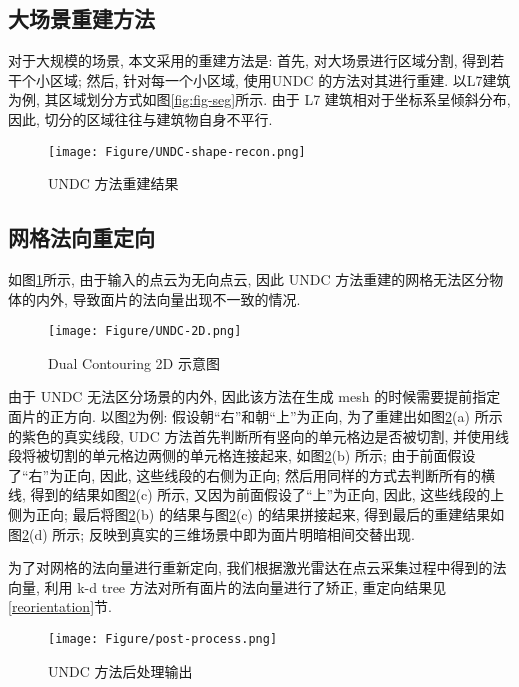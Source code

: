 \subsection{大场景重建方法}

对于大规模的场景, 本文采用的重建方法是: 
首先, 对大场景进行区域分割, 得到若干个小区域; 
然后, 针对每一个小区域, 使用UNDC 的方法对其进行重建. 
以L7建筑为例, 其区域划分方式如图\ref{fig:fig-seg}所示. 由于 L7 建筑相对于坐标系呈倾斜分布, 因此, 切分的区域往往与建筑物自身不平行. 
\vspace{0.5em} %
\begin{figure}[H]
	\center
	\texttt{[image: Figure/UNDC-shape-recon.png]}
	\centering
	\caption{UNDC 方法重建结果}\label{fig:fig-shape-recon}
\end{figure}

\subsection{网格法向重定向}

如图\ref{fig:fig-shape-recon}所示, 由于输入的点云为无向点云, 因此 UNDC 方法重建的网格无法区分物体的内外, 导致面片的法向量出现不一致的情况. 

\begin{figure}[H]
	\center
	\texttt{[image: Figure/UNDC-2D.png]}
	\centering
	\caption{Dual Contouring 2D 示意图}\label{fig:fig-2D-UNDC}
\end{figure}

由于 UNDC 无法区分场景的内外, 因此该方法在生成 mesh 的时候需要提前指定面片的正方向. 
以图\ref{fig:fig-2D-UNDC}为例: 假设朝“右”和朝“上”为正向, 为了重建出如图\ref{fig:fig-2D-UNDC}(a) 所示的紫色的真实线段, UDC 方法首先判断所有竖向的单元格边是否被切割, 并使用线段将被切割的单元格边两侧的单元格连接起来, 如图\ref{fig:fig-2D-UNDC}(b) 所示; 
由于前面假设了“右”为正向, 因此, 这些线段的右侧为正向; 
然后用同样的方式去判断所有的横线, 得到的结果如图\ref{fig:fig-2D-UNDC}(c) 所示, 又因为前面假设了“上”为正向, 因此, 这些线段的上侧为正向; 
最后将图\ref{fig:fig-2D-UNDC}(b) 的结果与图\ref{fig:fig-2D-UNDC}(c) 的结果拼接起来, 得到最后的重建结果如图\ref{fig:fig-2D-UNDC}(d) 所示; 
反映到真实的三维场景中即为面片明暗相间交替出现. 

为了对网格的法向量进行重新定向, 我们根据激光雷达在点云采集过程中得到的法向量, 利用 k-d tree 方法对所有面片的法向量进行了矫正, 重定向结果见\ref{reorientation}节. 
\vspace{-0.8cm} %
\begin{figure}[H]
	\center
	\texttt{[image: Figure/post-process.png]}
	\centering
	\caption{UNDC 方法后处理输出}\label{fig:fig-post}
\end{figure}

